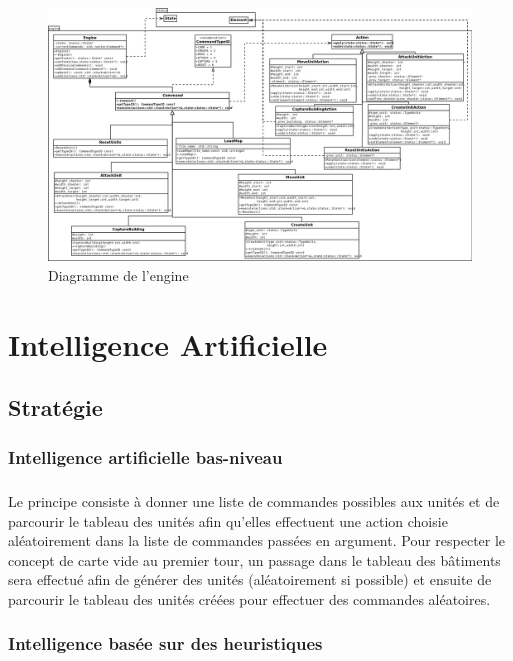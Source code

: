 \documentclass[12pt]{report}
\begin{document}
\begin{itemize}
    \newpage
\thispagestyle{empty}
\begin{landscape}
\begin{figure}[h]
    \begin{center}
    \includegraphics[scale=0.35]{engine.png}    
    \end{center}
    \caption{Diagramme de l'engine}
\end{figure}
\end{landscape}

\chapter{Intelligence Artificielle}
\section{Stratégie}
\subsection{Intelligence artificielle bas-niveau}
\paragraph{}Le principe consiste à donner une liste de commandes possibles aux unités et de parcourir le tableau des unités afin qu'elles effectuent une action choisie aléatoirement dans la liste de commandes passées en argument. Pour respecter le concept de carte vide au premier tour, un passage dans le tableau des bâtiments sera effectué afin de générer des unités (aléatoirement si possible) et ensuite de parcourir le tableau des unités créées pour effectuer des commandes aléatoires.
\subsection{Intelligence basée sur des heuristiques}

\end{itemize}
\end{document}
